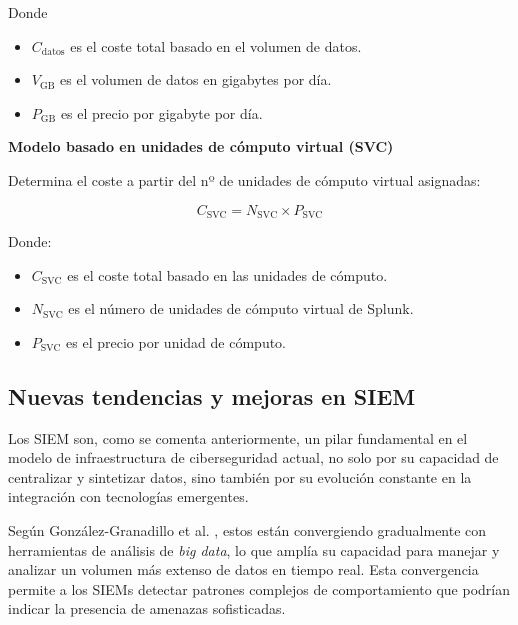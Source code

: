 Donde
\begin{itemize}
    \item $C_{\text{datos}}$ es el coste total basado en el volumen de datos.
    \item $V_{\text{GB}}$ es el volumen de datos en gigabytes por día.
    \item $P_{\text{GB}}$ es el precio por gigabyte por día.
\end{itemize}

\vspace{0.3cm}

\textbf{Modelo basado en unidades de cómputo virtual (SVC)} \footnotemark

Determina el coste a partir del nº de unidades de cómputo virtual asignadas:

\begin{equation}
    C_{\text{SVC}} = N_{\text{SVC}} \times P_{\text{SVC}}
\end{equation}

\vspace{-0.2cm}

Donde:
\begin{itemize}
    \item $C_{\text{SVC}}$ es el coste total basado en las unidades de cómputo.
    \item $N_{\text{SVC}}$ es el número de unidades de cómputo virtual de Splunk.
    \item $P_{\text{SVC}}$ es el precio por unidad de cómputo.
\end{itemize}


\newpage

\subsection{Nuevas tendencias y mejoras en \gls{SIEM}}

Los \gls{SIEM} son, como se comenta anteriormente, un pilar fundamental en el modelo de infraestructura de ciberseguridad actual, no solo por su capacidad de centralizar y sintetizar datos, sino también por su evolución constante en la integración con tecnologías emergentes. 

Según González-Granadillo et al. \cite{s21144759}, estos están convergiendo gradualmente con herramientas de análisis de \textit{big data}, lo que amplía su capacidad para manejar y analizar un volumen más extenso de datos en tiempo real. Esta convergencia permite a los \gls{SIEM}s detectar patrones complejos de comportamiento que podrían indicar la presencia de amenazas sofisticadas.

